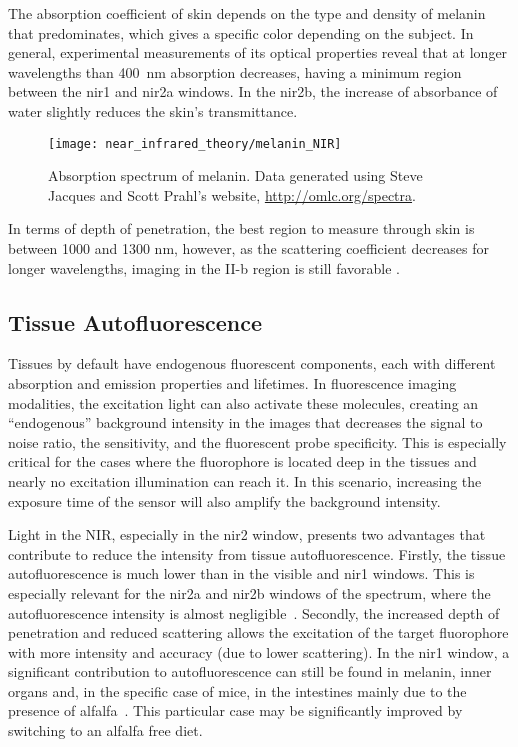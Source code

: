 The absorption coefficient of skin depends on the type and density of melanin that predominates, which gives a specific color depending on the subject. In general, experimental measurements of its optical properties reveal that at longer wavelengths than \SI{400}{\nm} absorption decreases, having a minimum region between the \gls{nir1} and \gls{nir2}a windows. In the \gls{nir2}b, the increase of absorbance of water slightly reduces the skin's transmittance. 
\begin{figure}
\centering
\texttt{[image: near\_infrared\_theory/melanin\_NIR]}
\caption[Absorption spectrum of melanin.]{Absorption spectrum of melanin. Data generated using Steve Jacques and Scott Prahl's website, \url{http://omlc.org/spectra}. }
\label{fig:theory_melanin_spectrum} 
\end{figure}

In terms of depth of penetration, the best region to measure through skin is between 1000 and 1300 nm, however, as the scattering coefficient decreases for longer wavelengths, imaging in the II-b region is still favorable \cite{Bashkatov2005}.


\subsection{Tissue Autofluorescence}
Tissues by default have endogenous fluorescent components, each with different absorption and emission properties and lifetimes. In fluorescence imaging modalities, the excitation light can also activate these molecules, creating an ``endogenous'' background intensity in the images that decreases the signal to noise ratio, the sensitivity, and the fluorescent probe specificity.
This is especially critical for the cases where the fluorophore is located deep in the tissues and nearly no excitation illumination can reach it. In this scenario, increasing the exposure time of the sensor will also amplify the background intensity. 

Light in the NIR, especially in the \gls{nir2} window, presents two advantages that contribute to reduce the intensity from tissue autofluorescence. Firstly, the tissue autofluorescence is much lower than in the visible and \gls{nir1} windows. This is especially relevant for the \gls{nir2}a and \gls{nir2}b windows of the spectrum, where the autofluorescence intensity is almost negligible~\cite{Smith2009a}. Secondly, the increased depth of penetration and reduced scattering allows the excitation of the target fluorophore with more intensity and accuracy (due to lower scattering). In the \gls{nir1} window, a significant contribution to autofluorescence can still be found in melanin, inner organs and, in the specific case of mice, in the intestines mainly due to the presence of alfalfa~\cite{DelRosal2016}. This particular case may be significantly improved by switching to an alfalfa free diet. 



